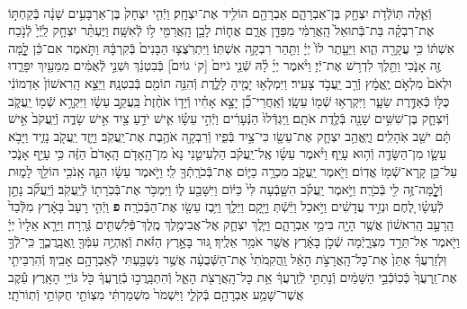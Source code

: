 \documentclass[twoside, openany, parskip=half, 11pt]{book}
\begin{document}
\begin{footnotesize}
\begin{multicols}{2}
\\
וְֿאֵ֛לֶּה תּֽוֹלְֿדֹ֥ת יִצְחָ֖ק בֶּן־אַבְרָהָ֑ם אַבְרָהָ֖ם הוֹלִ֥יד אֶת־יִצְחָֽק׃ וַיְֿהִ֤י יִצְחָק֙ בֶּן־אַרְבָּעִ֣ים שָׁנָ֔ה בְּֿקַחְתּ֣וֹ אֶת־רִבְקָ֗ה בַּת־בְּֿתוּאֵל֙ הָֽאֲרַמִּ֔י מִפַּדַּ֖ן אֲרָ֑ם אֲח֛וֹת לָבָ֥ן הָֽאֲרַמִּ֖י ל֥וֹ לְֿאִשָּֽׁה׃ וַיֶּעְתַּ֨ר יִצְחָ֤ק לַֽיְֿיָ֙ לְֿנֹ֣כַח אִשְׁתּ֔וֹ כִּ֥י עֲקָרָ֖ה הִ֑וא וַיֵּעָ֤תֶר לוֹ֙ יְיָ֔ וַתַּ֖הַר רִבְקָ֥ה אִשְׁתּֽוֹ׃ וַיִּתְרֹֽצֲצ֤וּ הַבָּנִים֙ בְּֿקִרְבָּ֔הּ וַתֹּ֣אמֶר אִם־כֵּ֔ן לׇׇׇָ֥מָּה זֶּ֖ה אָנֹ֑כִי וַתֵּ֖לֶךְ לִדְר֥שׁ אֶת־יְֿיָ׃  וַיֹּ֨אמֶר יְיָ֜ לָ֗הּ שְֿׁנֵ֤י גֹייִם֙ [ק‘ גוֹיִם֙] בְּֿבִטְנֵ֔ךְ וּשְׁנֵ֣י לְֿאֻמִּ֔ים מִמֵּעַ֖יִךְ יִפָּרֵ֑דוּ וּלְאֹם֙ מִלְאֹ֣ם יֶֽאֱמָ֔ץ וְֿרַ֖ב יַֽעֲבֹ֥ד צָעִֽיר׃ וַיִּמְלְא֥וּ יָמֶ֖יהָ לָלֶ֑דֶת וְֿהִנֵּ֥ה תוֹמִ֖ם בְּֿבִטְנָֽהּ׃ וַיֵּצֵ֤א הָֽרִאשׁוֹן֙ אַדְמוֹנִ֔י כֻּלּ֖וֹ כְּֿאַדֶּ֣רֶת שֵׂעָ֑ר וַיִּקְרְא֥וּ שְֿׁמ֖וֹ עֵשָֽׂו׃ וְֿאַֽחֲרֵי־כֵ֞ן יָצָ֣א אָחִ֗יו וְֿיָד֤וֹ אֹחֶ֨זֶת֙ בַּֽעֲקֵ֣ב עֵשָׂ֔ו וַיִּקְרָ֥א שְֿׁמ֖וֹ יַֽעֲקֹ֑ב וְֿיִצְחָ֛ק בֶּן־שִׁשִּׁ֥ים שָׁנָ֖ה בְּֿלֶ֥דֶת אֹתָֽם׃  וַֽיִּגְדְּֿלוּ֙ הַנְּֿעָרִ֔ים וַיְֿהִ֣י עֵשָׂ֗ו אִ֛ישׁ יֹדֵ֥עַ צַ֖יִד אִ֣ישׁ שָׂדֶ֑ה וְֿיַֽעֲקֹב֙ אִ֣ישׁ תָּ֔ם ישֵׁ֖ב אֹֽהָלִֽים׃ וַיֶּֽאֱהַ֥ב יִצְחָ֛ק אֶת־עֵשָׂ֖ו כִּי־צַ֣יִד בְּֿפִ֑יו וְֿרִבְקָ֖ה אֹהֶ֥בֶת אֶת־יַֽעֲקֹֽב׃ וַיָּ֥זֶד יַֽעֲקֹ֖ב נָזִ֑יד וַיָּבֹ֥א עֵשָׂ֛ו מִן־הַשָּׂדֶ֖ה וְֿה֥וּא עָיֵֽף׃ וַיֹּ֨אמֶר עֵשָׂ֜ו אֶֽל־יַֽעֲקֹ֗ב הַלְעִיטֵ֤נִי נָא֙ מִן־הָֽאָדֹ֤ם הָֽאָדֹם֙ הַזֶּ֔ה כִּ֥י עָיֵ֖ף אָנֹ֑כִי עַל־כֵּ֥ן קָֽרָא־שְֿׁמ֖וֹ אֱדֽוֹם׃ וַיֹּ֖אמֶר יַֽעֲקֹ֑ב מִכְרָ֥ה כַיּ֛וֹם אֶת־בְּֿכֹרָֽתְֿךָ֖ לִֽי׃ וַיֹּ֣אמֶר עֵשָׂ֔ו הִנֵּ֛ה אָֽנֹכִ֥י הוֹלֵ֖ךְ לָמ֑וּת וְֿלׇׇׇׇׇׇׇׇָֽמָּה־זֶּ֥ה לִ֖י בְּֿכֹרָֽה׃ וַיֹּ֣אמֶר יַֽעֲקֹ֗ב הִשָּׁ֤בְֿעָה לִּי֙ כַּיּ֔וֹם וַיִּשָּׁבַ֖ע ל֑וֹ וַיִּמְכֹּ֥ר אֶת־בְּֿכֹֽרָת֖וֹ לְֿיַֽעֲקֹֽב׃ וְֿיַֽעֲקֹ֞ב נָתַ֣ן לְֿעֵשָׂ֗ו לֶ֚חֶם וּנְזִ֣יד עֲדָשִׁ֔ים וַיֹּ֣אכַל וַיֵּ֔שְֿׁתְּ וַיָּ֖קָם וַיֵּלַ֑ךְ וַיִּ֥בֶז עֵשָׂ֖ו אֶת־הַבְּֿכֹרָֽה׃ \textbf{פ}
וַיְֿהִ֤י רָעָב֙ בָּאָ֔רֶץ מִלְּֿבַד֙ הָֽרָעָ֣ב הָֽרִאשׁ֔וֹן אֲשֶׁ֥ר הָיָ֖ה בִּימֵ֣י אַבְרָהָ֑ם וַיֵּ֧לֶךְ יִצְחָ֛ק אֶל־אֲבִימֶ֥לֶךְ מֶֽלֶךְ־פְּֿלִשְׁתִּ֖ים גְּֿרָֽרָה׃ וַיֵּרָ֤א אֵלָיו֙ יְיָ֔ וַיֹּ֖אמֶר אַל־תֵּרֵ֣ד מִצְרָ֑יְֿמָה שְֿׁכֹ֣ן בָּאָ֔רֶץ אֲשֶׁ֖ר אֹמַ֥ר אֵלֶֽיךָ׃ גּ֚וּר בָּאָ֣רֶץ הַזֹּ֔את וְֿאֶֽהְיֶ֥ה עִמְּֿךָ֖ וַֽאֲבָֽרֲכֶ֑ךָּ כִּֽי־לְֿךָ֣ וּֽלְזַרְעֲךָ֗ אֶתֵּן֙ אֶת־כׇּל־הָֽאֲרָצֹ֣ת הָאֵ֔ל וַֽהֲקִֽמֹתִי֙ אֶת־הַשְּֿׁבֻעָ֔ה אֲשֶׁ֥ר נִשְׁבַּ֖עְתִּי לְֿאַבְרָהָ֥ם אָבִֽיךָ׃ וְֿהִרְבֵּיתִ֤י אֶת־זַֽרְעֲךָ֙ כְּֿכֽוֹכְֿבֵ֣י הַשָּׁמַ֔יִם וְֿנָתַתִּ֣י לְֿזַֽרְעֲךָ֔ אֵ֥ת כׇּל־הָֽאֲרָצֹ֖ת הָאֵ֑ל וְֿהִתְבָּֽרֲכ֣וּ בְֿזַֽרְעֲךָ֔ כֹּ֖ל גּוֹיֵ֥י הָאָֽרֶץ׃ עֵ֕קֶב אֲשֶׁר־שָׁמַ֥ע אַבְרָהָ֖ם בְּֿקֹלִ֑י וַיִּשְׁמֹר֙ מִשְׁמַרְתִּ֔י מִצְוֹתַ֖י חֻקּוֹתַ֥י וְֿתֽוֹרֹתָֽי׃


\end{multicols}
\end{footnotesize}
\end{document}
